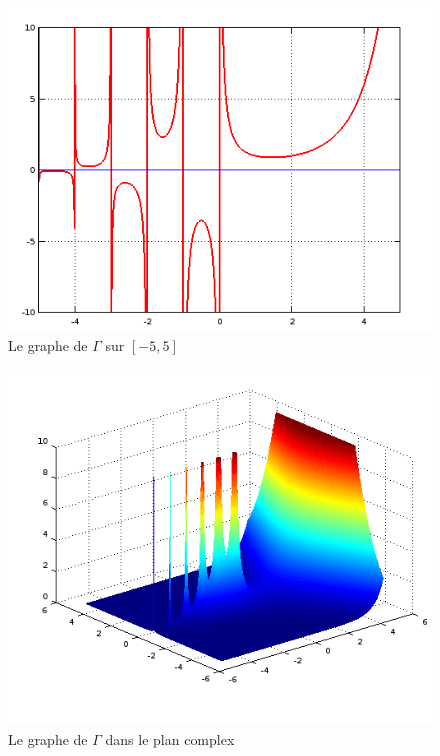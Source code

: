 \documentclass[a4paper,10pt]{article}
\begin{document}
\begin{figure}[h!]
    \centering
    \includegraphics[scale=0.7]{./img/gamma-negative.png}
    \caption{Le graphe de $\Gamma$ sur $[-5, 5]$}
    \label{fig:gamma}
\end{figure}

\begin{figure}[h!]
    \centering
    \includegraphics[scale=0.8]{./img/gamma-complex.png}
    \caption{Le graphe de $\Gamma$ dans le plan complex}
    \label{fig:gcomplex}
\end{figure}
\end{document}
